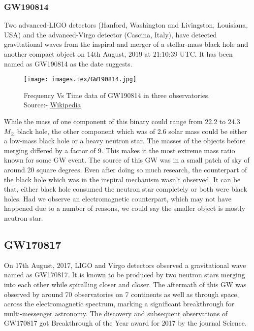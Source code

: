 \subsubsection{GW190814}

Two advanced-LIGO detectors (Hanford, Washington and Livingston, Louisiana, USA) and the advanced-Virgo detector (Cascina, Italy), have detected gravitational waves from the inspiral and merger of a stellar-mass black hole and another compact object on 14th August, 2019 at 21:10:39 UTC. It has been named as GW190814 as the date suggests.

\begin{figure}[h]
    \centering
    \texttt{[image: images.tex/GW190814.jpg]}
    \caption{Frequency Vs Time data of GW190814 in three observatories. Source:- \href{https://en.wikipedia.org/wiki/GW190814}{Wikipedia}}
\end{figure}

While the mass of one component of this binary could range from 22.2 to 24.3 $M_\odot$ black hole, the other component which was of 2.6 solar mass could be either a low-mass black hole or a heavy neutron star. The masses of the objects before merging differed by a factor of 9. This makes it the most extreme mass ratio known for some GW event. The source of this GW was in a small patch of sky of around 20 square degrees. Even after doing so much research, the counterpart of the black hole which was in the inspiral mechanism wasn’t observed. It can be that, either black hole consumed the neutron star completely or both were black holes. Had we observe an electromagnetic counterpart, which may not have happened due to a number of reasons, we could say the smaller object is mostly neutron star. 

\pagebreak

\subsection{GW170817}

On 17th August, 2017, LIGO and Virgo detectors observed a gravitational wave named as GW170817. It is known to be produced by two neutron stars merging into each other while spiralling closer and closer. The aftermath of this GW was observed by around 70 observatories on 7 continents as well as through space, across the electromagnetic spectrum, marking a significant breakthrough for multi-messenger astronomy. The discovery and subsequent observations of GW170817 got Breakthrough of the Year award for 2017 by the journal Science.


